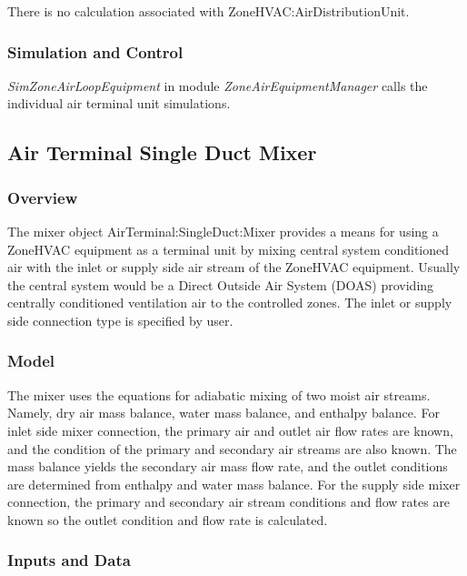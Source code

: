There is no calculation associated with ZoneHVAC:AirDistributionUnit.

\subsubsection{Simulation and Control}\label{simulation-and-control-004}

\emph{SimZoneAirLoopEquipment} in module \emph{ZoneAirEquipmentManager} calls the individual air terminal unit simulations.

\subsection{Air Terminal Single Duct Mixer}\label{air-terminal-single-duct-mixer}

\subsubsection{Overview}\label{overview-1-009}

The mixer object AirTerminal:SingleDuct:Mixer provides a means for using a ZoneHVAC equipment as a terminal unit by mixing central system conditioned air with the inlet or supply side air stream of the ZoneHVAC equipment. Usually the central system would be a Direct Outside Air System (DOAS) providing centrally conditioned ventilation air to the controlled zones. The inlet or supply side connection type is specified by user.

\subsubsection{Model}\label{model-1-000}

The mixer uses the equations for adiabatic mixing of two moist air streams. Namely, dry air mass balance, water mass balance, and enthalpy balance. For inlet side mixer connection, the primary air and outlet air flow rates are known, and the condition of the primary and secondary air streams are also known. The mass balance yields the secondary air mass flow rate, and the outlet conditions are determined from enthalpy and water mass balance. For the supply side mixer connection, the primary and secondary air stream conditions and flow rates are known so the outlet condition and flow rate is calculated.

\subsubsection{Inputs and Data}\label{inputs-and-data-1-000}

